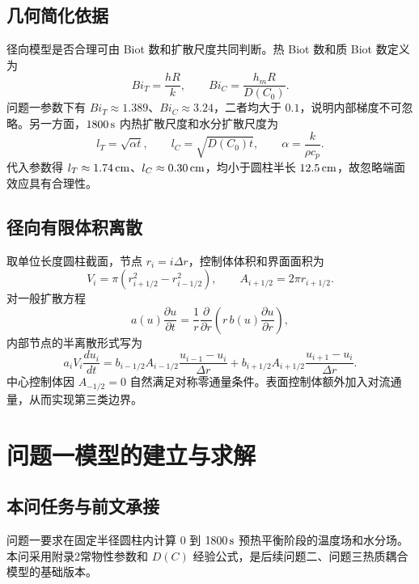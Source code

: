 \documentclass[UTF8,a4paper,12pt]{ctexart}
\numberwithin{equation}{section}
\begin{document}
\subsection{几何简化依据}
径向模型是否合理可由 Biot 数和扩散尺度共同判断。热 Biot 数和质 Biot 数定义为
\begin{equation}
  Bi_T=\frac{hR}{k},\qquad Bi_C=\frac{h_mR}{D(C_0)}.
\end{equation}
问题一参数下有 $Bi_T\approx1.389$、$Bi_C\approx3.24$，二者均大于 $0.1$，说明内部梯度不可忽略。另一方面，$1800\rm\,s$ 内热扩散尺度和水分扩散尺度为
\begin{equation}
  l_T=\sqrt{\alpha t},\qquad l_C=\sqrt{D(C_0)t},\qquad \alpha=\frac{k}{\rho c_p}.
\end{equation}
代入参数得 $l_T\approx1.74\rm\,cm$、$l_C\approx0.30\rm\,cm$，均小于圆柱半长 $12.5\rm\,cm$，故忽略端面效应具有合理性。

\subsection{径向有限体积离散}
取单位长度圆柱截面，节点 $r_i=i\Delta r$，控制体体积和界面面积为
\begin{equation}
  V_i=\pi\left(r_{i+1/2}^2-r_{i-1/2}^2\right),\qquad
  A_{i+1/2}=2\pi r_{i+1/2}.
\end{equation}
对一般扩散方程
\begin{equation}
  a(u)\frac{\partial u}{\partial t}
  =\frac1r\frac{\partial}{\partial r}\left(r\,b(u)\frac{\partial u}{\partial r}\right),
\end{equation}
内部节点的半离散形式写为
\begin{equation}
  a_iV_i\frac{du_i}{dt}
  =b_{i-1/2}A_{i-1/2}\frac{u_{i-1}-u_i}{\Delta r}
  +b_{i+1/2}A_{i+1/2}\frac{u_{i+1}-u_i}{\Delta r}.
\end{equation}
中心控制体因 $A_{-1/2}=0$ 自然满足对称零通量条件。表面控制体额外加入对流通量，从而实现第三类边界。

\section{问题一模型的建立与求解}
\subsection{本问任务与前文承接}
问题一要求在固定半径圆柱内计算 $0$ 到 $1800\rm\,s$ 预热平衡阶段的温度场和水分场。本问采用附录2常物性参数和 $D(C)$ 经验公式，是后续问题二、问题三热质耦合模型的基础版本。
\end{document}
